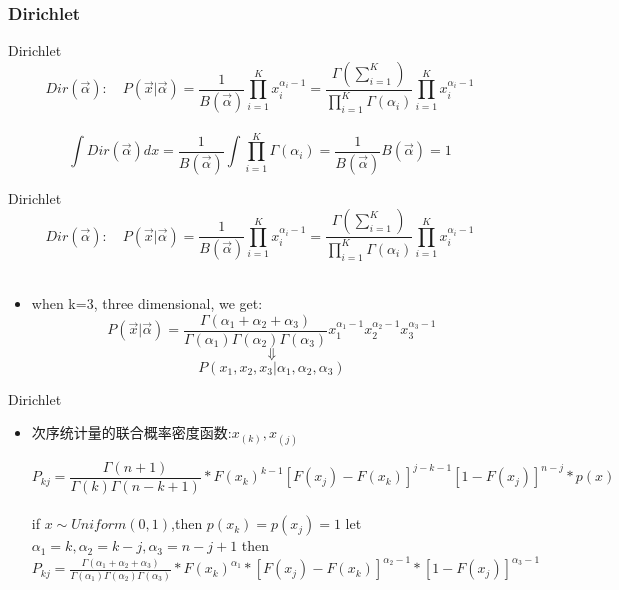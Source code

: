 \documentclass{beamer}
\begin{document}
\begin{CJK*}{UTF8}{gbsn}
\subsubsection{Dirichlet}
\begin{frame}{Dirichlet}
$$
Dir(\overrightarrow{\alpha}):\quad P(\overrightarrow{x}|\overrightarrow{\alpha})=\frac{1}{B(\overrightarrow{\alpha})}\prod_{i=1}^Kx_i^{\alpha_i-1}=\frac{\Gamma(\sum_{i=1}^K)}{\prod_{i=1}^K\Gamma(\alpha_i)}\prod_{i=1}^Kx_i^{\alpha_i-1}
$$\\ $$\int Dir(\overrightarrow{\alpha})dx=\frac{1}{B(\overrightarrow{\alpha})}\int{\prod_{i=1}^K\Gamma(\alpha_i)}=\frac{1}{B(\overrightarrow{\alpha})}B(\overrightarrow{\alpha})=1$$
\end{frame}

\begin{frame}{Dirichlet}
$$
Dir(\overrightarrow{\alpha}):\quad P(\overrightarrow{x}|\overrightarrow{\alpha})=\frac{1}{B(\overrightarrow{\alpha})}\prod_{i=1}^Kx_i^{\alpha_i-1}=\frac{\Gamma(\sum_{i=1}^K)}{\prod_{i=1}^K\Gamma(\alpha_i)}\prod_{i=1}^Kx_i^{\alpha_i-1}
$$\\
\begin{itemize}
\item when k=3, three dimensional, we get:
$$P(\overrightarrow{x}|\overrightarrow{\alpha})=\frac{\Gamma(\alpha_1+\alpha_2+\alpha_3)}{{\Gamma(\alpha_1)\Gamma(\alpha_2)\Gamma(\alpha_3)}}x_1^{\alpha_1-1}x_2^{\alpha_2-1}x_3^{\alpha_3-1}$$
$$\Downarrow$$
$$P(x_1,x_2,x_3|\alpha_1,\alpha_2,\alpha_3)$$
\end{itemize}
\end{frame}

\begin{frame}{Dirichlet}
\begin{itemize}
\item {次序统计量的联合概率密度函数:}$x_{(k)},x_{(j)}$
\begin{small}
\[P_{kj}=\frac{\Gamma(n+1)}{{\Gamma(k)\Gamma(n-k+1)}}*F(x_k)^{k-1}[F(x_j)-F(x_k)]^{j-k-1}[1-F(x_j)]^{n-j}*p(x)\]\\{if }$x\sim Uniform(0,1)${,then} $p(x_k)=p(x_j)=1$ {let}\ $\alpha_1=k,\alpha_2=k-j,\alpha_3=n-j+1 $ {then}
$P_{kj}=\frac{\Gamma(\alpha_1+\alpha_2+\alpha_3)}{{\Gamma(\alpha_1)\Gamma(\alpha_2)\Gamma(\alpha_3)}}*F(x_k)^{\alpha_1}*[F(x_j)-F(x_k)]^{\alpha_2-1}*[1-F(x_j)]^{\alpha_3-1}$
\end{small}	
\end{itemize}
\end{frame}



\end{CJK*}
\end{document}
